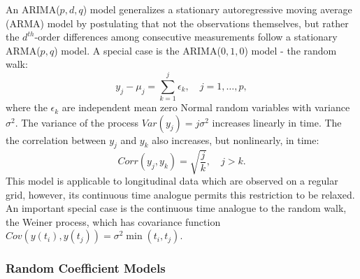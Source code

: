 An ARIMA($p,d,q$) model generalizes a stationary autoregressive moving average (ARMA) model by postulating that not the observations themselves, but rather the $d^{th}$-order differences among consecutive measurements follow a stationary ARMA($p,q$) model. A special case is the ARIMA($0,1,0$) model - the random walk:
\begin{equation}
y_{j} - \mu_{j} =   \sum_{k = 1}^j \epsilon_{k}, \quad j = 1, \dots, p,
\end{equation}
\noindent
where the $\epsilon_{k}$ are independent mean zero Normal random variables with variance $\sigma^2$. The variance of the process $Var\left(y_j\right) = j\sigma^2$ increases linearly in time. The the correlation between $y_{j}$ and $y_{k}$ also increases, but nonlinearly, in time:
\[
Corr\left(y_{j},y_{k}\right) = \sqrt{\frac{{j}}{{k}}}, \quad j > k.
\]
\noindent
This model is applicable to longitudinal data which are observed on a regular grid, however, its continuous time analogue permits this restriction to be relaxed. An important special case is the continuous time analogue to the random walk, the Weiner process, which has covariance function $Cov\left(y\left(t_i\right), y\left(t_j\right)\right) = \sigma^2 \min\left(t_i, t_j\right)$.

\subsubsection{Random Coefficient Models}


